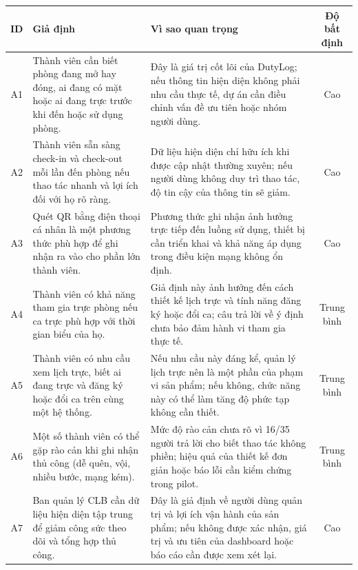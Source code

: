 \begin{tabularx}{\textwidth}{|c|X|X|c|}
\hline
\textbf{ID} & \textbf{Giả định} & \textbf{Vì sao quan trọng} & \textbf{Độ bất định} \\ \hline
A1 & Thành viên cần biết phòng đang mở hay đóng, ai đang có mặt hoặc ai đang trực trước khi đến hoặc sử dụng phòng. & Đây là giá trị cốt lõi của DutyLog; nếu thông tin hiện diện không phải nhu cầu thực tế, dự án cần điều chỉnh vấn đề ưu tiên hoặc nhóm người dùng. & Cao \\ \hline
A2 & Thành viên sẵn sàng check-in và check-out mỗi lần đến phòng nếu thao tác nhanh và lợi ích đối với họ rõ ràng. & Dữ liệu hiện diện chỉ hữu ích khi được cập nhật thường xuyên; nếu người dùng không duy trì thao tác, độ tin cậy của thông tin sẽ giảm. & Cao \\ \hline
A3 & Quét QR bằng điện thoại cá nhân là một phương thức phù hợp để ghi nhận ra vào cho phần lớn thành viên. & Phương thức ghi nhận ảnh hưởng trực tiếp đến luồng sử dụng, thiết bị cần triển khai và khả năng áp dụng trong điều kiện mạng không ổn định. & Cao \\ \hline
A4 & Thành viên có khả năng tham gia trực phòng nếu ca trực phù hợp với thời gian biểu của họ. & Giả định này ảnh hưởng đến cách thiết kế lịch trực và tính năng đăng ký hoặc đổi ca; câu trả lời về ý định chưa bảo đảm hành vi tham gia thực tế. & Trung bình \\ \hline
A5 & Thành viên có nhu cầu xem lịch trực, biết ai đang trực và đăng ký hoặc đổi ca trên cùng một hệ thống. & Nếu nhu cầu này đáng kể, quản lý lịch trực nên là một phần của phạm vi sản phẩm; nếu không, chức năng này có thể làm tăng độ phức tạp không cần thiết. & Trung bình \\ \hline
A6 & Một số thành viên có thể gặp rào cản khi ghi nhận thủ công (dễ quên, vội, nhiều bước, mạng kém). & Mức độ rào cản chưa rõ vì 16/35 người trả lời cho biết thao tác không phiền; hiệu quả của thiết kế đơn giản hoặc báo lỗi cần kiểm chứng trong pilot. & Trung bình \\ \hline
A7 & Ban quản lý CLB cần dữ liệu hiện diện tập trung để giảm công sức theo dõi và tổng hợp thủ công. & Đây là giả định về người dùng quản trị và lợi ích vận hành của sản phẩm; nếu không được xác nhận, giá trị và ưu tiên của dashboard hoặc báo cáo cần được xem xét lại. & Cao \\ \hline
\end{tabularx}\par
\normalsize
\setlength{\tabcolsep}{6pt}
